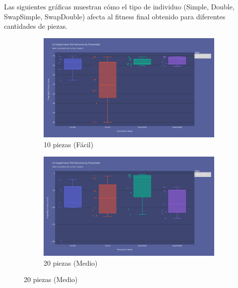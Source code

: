 \documentclass[11pt,spanish,listoffigures,listoftables]{tfgetsinf}
\begin{document}
Las siguientes gráficas muestran cómo el tipo de individuo (Simple, Double, SwapSimple, SwapDouble) afecta al fitness final obtenido para diferentes cantidades de piezas.

\begin{figure}[H]
    \centering
    \begin{subfigure}[b]{0.48\textwidth}
        \centering
        \includegraphics[width=\textwidth]{images/GA_np-10_movements.png}
        \caption{10 piezas (Fácil)}
        \label{fig:ga_np10_movements}
    \end{subfigure}
    \hfill
    \begin{subfigure}[b]{0.48\textwidth}
        \centering
        \includegraphics[width=\textwidth]{images/GA_np-20_movements.png}
        \caption{20 piezas (Medio)}
        \label{fig:ga_np20_movements}
    \end{subfigure}
    
    \vspace{0.5cm}
    

\end{figure}
\end{document}
